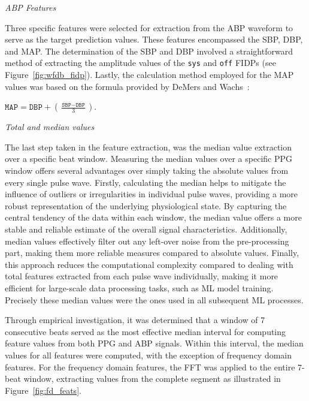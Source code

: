 \newpage
\textit{ABP Features}
\vspace{0.2cm}

Three specific features were selected for extraction from the ABP waveform to serve as the target prediction values.
These features encompassed the SBP, DBP, and MAP\@.
The determination of the SBP and DBP involved a straightforward method of extracting the amplitude values of the \texttt{sys} and \texttt{off} FIDPs (see Figure~\ref{fig:wfdb_fidp}).
Lastly, the calculation method employed for the MAP values was based on the formula provided by DeMers and Wachs~\cite{demersPhysiologyMeanArterial2024}:

\vspace{-0.5cm}
\large
\begin{center}
    \begin{math}
        \texttt{MAP} = \texttt{DBP} + \left(\frac{\texttt{SBP} - \texttt{DBP}}{3}\right).
    \end{math}
\end{center}
\normalsize

\textit{Total and median values}
\vspace{0.2cm}

The last step taken in the feature extraction, was the median value extraction over a specific beat window.
Measuring the median values over a specific PPG window offers several advantages over simply taking the absolute values from every single pulse wave.
Firstly, calculating the median helps to mitigate the influence of outliers or irregularities in individual pulse waves, providing a more robust representation of the underlying physiological state.
By capturing the central tendency of the data within each window, the median value offers a more stable and reliable estimate of the overall signal characteristics.
Additionally, median values effectively filter out any left-over noise from the pre-processing part, making them more reliable measures compared to absolute values.
Finally, this approach reduces the computational complexity compared to dealing with total features extracted from each pulse wave individually, making it more efficient for large-scale data processing tasks, such as ML model training.
Precisely these median values were the ones used in all subsequent ML processes.

Through empirical investigation, it was determined that a window of 7 consecutive beats served as the most effective median interval
for computing feature values from both PPG and ABP signals.
Within this interval, the median values for all features were computed, with the exception of frequency domain features.
For the frequency domain features, the FFT was applied to the entire 7-beat window, extracting values from the complete segment as illustrated in Figure~\ref{fig:fd_feats}.

